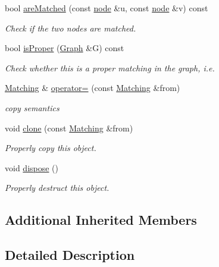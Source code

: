 \begin{DoxyCompactItemize}
bool \hyperlink{class_ensemble_clustering_1_1_matching_ad2637dece8a3a56d9f62f3c9df4713db}{are\-Matched} (const \hyperlink{namespace_ensemble_clustering_ae829290aeccd1a420b17a37fd901f114}{node} \&u, const \hyperlink{namespace_ensemble_clustering_ae829290aeccd1a420b17a37fd901f114}{node} \&v) const 
\begin{DoxyCompactList}\small\item\em Check if the two nodes are matched. \end{DoxyCompactList}\item 
bool \hyperlink{class_ensemble_clustering_1_1_matching_a29b8fa3ba916f0b3d73b184c883c36b6}{is\-Proper} (\hyperlink{class_ensemble_clustering_1_1_graph}{Graph} \&G) const 
\begin{DoxyCompactList}\small\item\em Check whether this is a proper matching in the graph, i.\-e. \end{DoxyCompactList}\item 
\hyperlink{class_ensemble_clustering_1_1_matching}{Matching} \& \hyperlink{class_ensemble_clustering_1_1_matching_a3b523f31e77718537c0883874442be0c}{operator=} (const \hyperlink{class_ensemble_clustering_1_1_matching}{Matching} \&from)
\begin{DoxyCompactList}\small\item\em copy semantics \end{DoxyCompactList}\item 
void \hyperlink{class_ensemble_clustering_1_1_matching_a6753fd67c53b6e0d94f2d6e0d6de640e}{clone} (const \hyperlink{class_ensemble_clustering_1_1_matching}{Matching} \&from)
\begin{DoxyCompactList}\small\item\em Properly copy this object. \end{DoxyCompactList}\item 
void \hyperlink{class_ensemble_clustering_1_1_matching_ae7e8c62662439dc7adae829506d2dd32}{dispose} ()
\begin{DoxyCompactList}\small\item\em Properly destruct this object. \end{DoxyCompactList}\end{DoxyCompactItemize}
\subsection*{Additional Inherited Members}


\subsection{Detailed Description}


